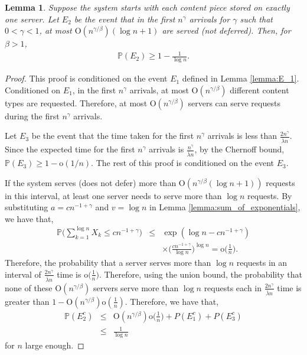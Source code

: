 \documentclass[10pt, conference, letterpaper]{IEEEtran}
\newtheorem{lemma}{Lemma}
\def \OO {\mathrm{O}}
\def \oo {\mathrm{o}}
\begin{document}
\begin{lemma}
	\label{lemma:E_2}
	Suppose the system starts with each content piece stored on exactly one server. Let $E_2$ be the event that in the first $n^{\gamma}$ arrivals for $\gamma$ such that $0 < \gamma < 1$, at most $\OO(n^{\gamma/\beta})(\log n+1) $ are served (not deferred). Then, for $\beta > 1$,
	\begin{eqnarray}
	\label{eq:E_2}
	\mathbb{P}(E_2) \geq 1- \frac{1}{\log n}.
	\end{eqnarray}
\end{lemma}
\begin{proof}
	This proof is conditioned on the event $E_1$ defined in Lemma \ref{lemma:E_1}. Conditioned on $E_1$, in the first $n^{\gamma}$ arrivals, at most $\OO(n^{\gamma/\beta})$ different content types are requested. Therefore, at most $\OO(n^{\gamma/\beta})$ servers can serve requests during the first $n^{\gamma}$ arrivals.
	
	Let $E_3$ be the event that the time taken for the first $n^{\gamma}$ arrivals is less than $\frac{2n^{\gamma}}{\bar{\lambda} n}$. Since the expected time for the first $n^{\gamma}$ arrivals is $\frac{n^{\gamma}}{\bar{\lambda} n}$, by the Chernoff bound, $\mathbb{P}(E_3) \geq 1-\oo(1/n)$. The rest of this proof is conditioned on the event $E_3$.
	
	If the system serves (does not defer) more than $\OO(n^{\gamma/\beta}(\log n+1))$ requests in this interval, at least one server needs to serve more than $\log n$ requests. By substituting $a = cn^{-1+\gamma}$ and $v = \log n$ in Lemma \ref{lemma:sum_of_exponentials}, we have that,
	\begin{eqnarray*}
		\mathbb{P}\bigg(\sum_{k=1}^{\log n} X_k \leq cn^{-1+\gamma}\bigg) &\leq&  \exp(\log n-cn^{-1+\gamma})\\
		&&\times \bigg(\frac{cn^{-1+\gamma}}{\log n}\bigg)^{\log n} = \oo \bigg(\frac{1}{n}\bigg).
	\end{eqnarray*}
	Therefore, the probability that a server serves more than $\log n$ requests in an interval of $\frac{2n^{\gamma}}{\bar{\lambda} n}$ time is $ \oo \big(\frac{1}{n}\big)$. Therefore, using the union bound, the probability that none of these $\OO(n^{\gamma/\beta})$ servers serve more than $\log n$ requests each in $\frac{2n^{\gamma}}{\bar{\lambda} n}$ time is greater than $ 1 - \OO(n^{\gamma/\beta})\oo(\frac{1}{n})$.
	Therefore, we have that,
	\begin{eqnarray*}
		\mathbb{P}(E_2^c) &\leq& \OO(n^{\gamma/\beta}) \oo\bigg(\frac{1}{n}\bigg) + P(E_1^c) + P(E_3^c)\\
		&\leq& \frac{1}{\log n}
	\end{eqnarray*}
	for $n$ large enough.
\end{proof}
\end{document}
